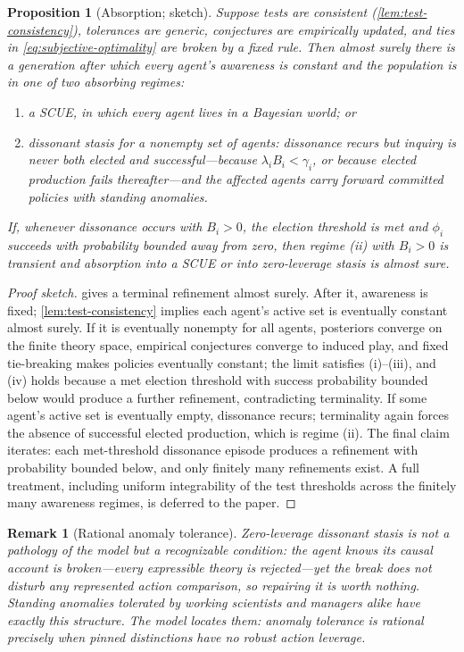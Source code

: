 \documentclass[11pt]{article}
\newtheorem{proposition}[assumption]{Proposition}
\newtheorem{remark}[assumption]{Remark}
\begin{document}
\begin{proposition}[Absorption; sketch]
\label{prop:absorption}
Suppose tests are consistent (\cref{lem:test-consistency}), tolerances are
generic, conjectures are empirically updated, and ties in
\cref{eq:subjective-optimality} are broken by a fixed rule.  Then almost
surely there is a generation after which every agent's awareness is constant
and the population is in one of two absorbing regimes:
\begin{enumerate}[label=(\roman*)]
  \item a SCUE, in which every agent lives in a Bayesian world; or
  \item \emph{dissonant stasis} for a nonempty set of agents: dissonance
  recurs but inquiry is never both elected and successful---because
  $\lambda_iB_i<\gamma_i$, or because elected production fails
  thereafter---and the affected agents carry forward committed policies with
  standing anomalies.
\end{enumerate}
If, whenever dissonance occurs with $B_i>0$, the election threshold is met and
$\phi_i$ succeeds with probability bounded away from zero, then regime (ii)
with $B_i>0$ is transient and absorption into a SCUE or into zero-leverage
stasis is almost sure.
\end{proposition}

\begin{proof}[Proof sketch]
 gives a terminal refinement almost surely.
After it, awareness is fixed; \cref{lem:test-consistency} implies each agent's
active set is eventually constant almost surely.  If it is eventually
nonempty for all agents, posteriors converge on the finite theory space,
empirical conjectures converge to induced play, and fixed tie-breaking makes
policies eventually constant; the limit satisfies (i)--(iii), and (iv) holds
because a met election threshold with success probability bounded below would
produce a further refinement, contradicting terminality.  If some agent's
active set is eventually empty, dissonance recurs; terminality again forces
the absence of successful elected production, which is regime (ii).  The
final claim iterates: each met-threshold dissonance episode produces a
refinement with probability bounded below, and only finitely many refinements
exist.  A full treatment, including uniform integrability of the test
thresholds across the finitely many awareness regimes, is deferred to the
paper.
\end{proof}

\begin{remark}[Rational anomaly tolerance]
\label{rem:anomaly-tolerance}
Zero-leverage dissonant stasis is not a pathology of the model but a
recognizable condition: the agent knows its causal account is broken---every
expressible theory is rejected---yet the break does not disturb any
represented action comparison, so repairing it is worth nothing.  Standing
anomalies tolerated by working scientists and managers alike have exactly
this structure.  The model locates them: anomaly tolerance is rational
precisely when pinned distinctions have no robust action leverage.
\end{remark}
\end{document}
